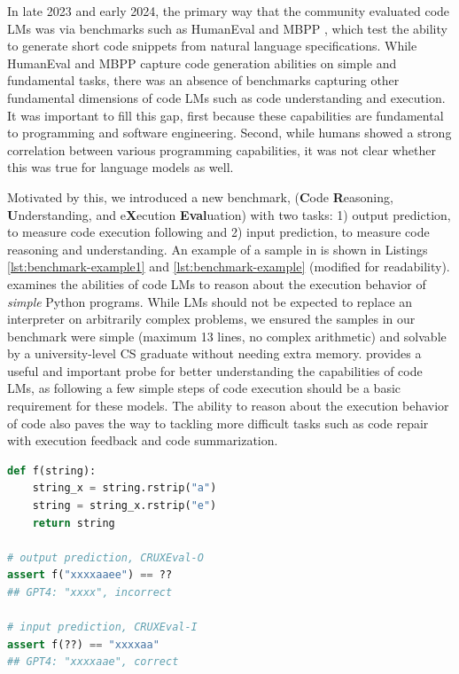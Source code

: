 In late 2023 and early 2024, the primary way that the community evaluated code LMs was
via benchmarks such as HumanEval \citep{chen2021evaluating} and MBPP \citep{austin2021program},
which test the ability to generate short code snippets from natural language
specifications. While HumanEval and MBPP capture code generation abilities on simple and fundamental tasks, there was an absence of benchmarks capturing other
fundamental dimensions of code LMs such as code understanding and execution.
It was important to fill this gap, first because these capabilities are fundamental to programming 
and software engineering. Second, while humans showed a strong correlation between various
programming capabilities, it was not clear whether this was true for language models as well.

\begin{sloppypar}
Motivated by this, we introduced a new benchmark, \benchmark (\textbf{C}ode \textbf{R}easoning, \textbf{U}nderstanding, and e\textbf{X}ecution \textbf{Eval}uation) with two tasks: 1) output prediction, \benchmarko to measure code execution following and 2) input prediction, \benchmarki to measure code reasoning and understanding. An example of a sample in \benchmark is shown in Listings \ref{lst:benchmark-example1} and \ref{lst:benchmark-example} (modified for readability). \benchmark examines the abilities of code LMs to reason about the execution behavior of \textit{simple} Python programs. While LMs should not be expected to replace an interpreter on arbitrarily complex problems, we ensured the samples in our benchmark were simple (maximum 13 lines, no complex arithmetic) and solvable by a university-level CS graduate without needing extra memory. \benchmark provides a useful and important probe for better understanding the capabilities of code LMs, as following a few simple steps of code execution should be a basic requirement for these models. The ability to reason about the execution behavior of code also paves the way to tackling more difficult tasks such as code repair with execution feedback and code summarization.
\end{sloppypar}
\noindent\begin{minipage}[t]{.48\textwidth}
\vspace{0pt}
\begin{lstlisting}[caption={Sample problem},label={lst:benchmark-example1}, captionpos=t, breaklines=true, language=Python, basicstyle=\ttfamily\scriptsize, breakindent=0pt, postbreak={}]
def f(string):
    string_x = string.rstrip("a")
    string = string_x.rstrip("e")
    return string

# output prediction, CRUXEval-O
assert f("xxxxaaee") == ??
## GPT4: "xxxx", incorrect

# input prediction, CRUXEval-I
assert f(??) == "xxxxaa"
## GPT4: "xxxxaae", correct
\end{lstlisting}
\end{minipage}\hfill
